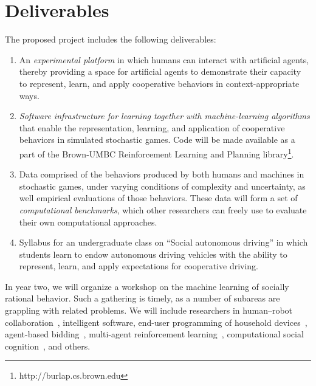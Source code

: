 
\section{Deliverables}

The proposed project includes the following deliverables: 

\begin{enumerate}

\item An {\em experimental platform\/} in which humans can interact
  with artificial agents, thereby providing a space for
  artificial agents to demonstrate their capacity to represent, learn,
  and apply cooperative behaviors in context-appropriate ways.

\item {\em Software infrastructure for learning together with
  machine-learning algorithms\/} that enable the representation,
  learning, and application of cooperative behaviors in simulated
  stochastic games.
  Code will be made available as a part of the Brown-UMBC
  Reinforcement Learning and Planning
  library\footnote{http://burlap.cs.brown.edu}.

\item Data comprised of the behaviors produced by both humans and
  machines in stochastic games, under varying conditions of complexity
  and uncertainty, as well empirical evaluations of those behaviors.
  These data will form a set of {\em computational benchmarks}, which
  other researchers can freely use to evaluate their own computational
  approaches. 

\item Syllabus for an undergraduate class on ``Social autonomous
  driving'' in which students learn to endow autonomous driving
  vehicles with the ability to represent, learn, and apply
  expectations for cooperative driving.

\end{enumerate}

In year two, we will organize a workshop on the machine learning of
socially rational behavior. Such a gathering is timely, as a number of
subareas are grappling with related problems. We will include
researchers in human--robot collaboration~\cite{gopalan15}, intelligent
software, end-user programming of household devices~\cite{ur14},
agent-based bidding~\cite{tac:book}, multi-agent reinforcement
learning~\cite{sodomka13}, computational social
cognition~\cite{baker14}, and others.
